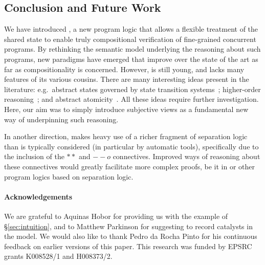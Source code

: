 \subsection*{Conclusion and Future Work}

We have introduced \colosl, a new program logic that allows a flexible
treatment of the shared state to enable truly compositional
verification of fine-grained concurrent programs. By rethinking the
semantic model underlying the reasoning about such programs, new
paradigms have emerged that improve over the state of the art as far
as compositionality is concerned. However, \colosl is still young, and
lacks many features of its various cousins.  There are many
interesting ideas present in the literature: e.g.\ abstract states
governed by state transition systems~\cite{caresl}; higher-order
reasoning~\cite{icap}; and abstract atomicity~\cite{tada}. All these
ideas require further investigation. Here, our aim was to simply
introduce subjective views as a fundamental new way of underpinning such reasoning.

In another direction, \colosl makes heavy use of a richer fragment
of separation logic than is typically considered (in particular by
automatic tools), specifically due to the inclusion of the $**$ and
$--o$ connectives. Improved ways of reasoning about these connectives
would greatly facilitate more complex proofs, be it in \colosl or
other program logics based on separation logic.


\paragraph{Acknowledgements}
We are grateful to Aquinas Hobor for providing us with the example of
\S\ref{sec:intuition}, and to Matthew Parkinson for
suggesting to record catalysts in the model. We would also like to thank
Pedro da Rocha Pinto for his continuous feedback on earlier versions
of this paper. This research was funded by EPSRC grants K008528/1 and
H008373/2.
